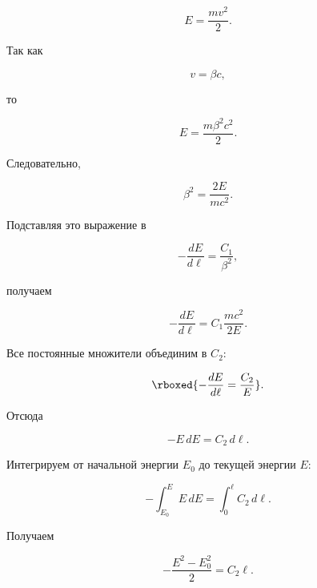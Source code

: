 \documentclass[../final.tex]{subfiles}
\begin{document}
\begin{equation*}
    E
    =
    \frac{mv^2}{2}.
\end{equation*}

Так как

\begin{equation*}
    v=\beta c,
\end{equation*}

то

\begin{equation*}
    E
    =
    \frac{m\beta^2c^2}{2}.
\end{equation*}

Следовательно,

\begin{equation*}
    \beta^2
    =
    \frac{2E}{mc^2}.
\end{equation*}

Подставляя это выражение в

\begin{equation*}
    -
    \frac{dE}{d\ell}
    =
    \frac{C_1}{\beta^2},
\end{equation*}

получаем

\begin{equation*}
    -
    \frac{dE}{d\ell}
    =
    C_1
    \frac{mc^2}{2E}.
\end{equation*}

Все постоянные множители объединим в $C_2$:

\begin{equation*}
    \rboxed{
        -
        \frac{dE}{d\ell}
        =
        \frac{C_2}{E}
    }.
\end{equation*}

Отсюда

\begin{equation*}
    -E\,dE
    =
    C_2\,d\ell.
\end{equation*}

Интегрируем от начальной энергии $E_0$
до текущей энергии $E$:

\begin{equation*}
    -
    \int_{E_0}^{E}
    E\,dE
    =
    \int_0^\ell
    C_2\,d\ell.
\end{equation*}

Получаем

\begin{equation*}
    -
    \frac{
        E^2-E_0^2
    }{2}
    =
    C_2\ell.
\end{equation*}
\end{document}

